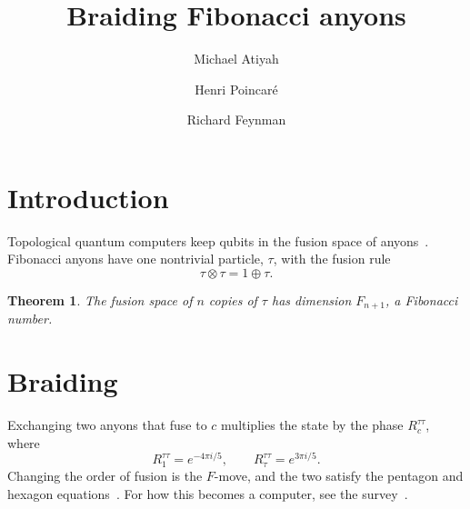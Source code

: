 \documentclass[10pt]{article}
\title{Braiding Fibonacci anyons}
\author{Michael Atiyah \and Henri Poincar\'e \and Richard Feynman}
\date{}
\newtheorem{theorem}{Theorem}
\begin{document}
\maketitle

\section{Introduction}
Topological quantum computers keep qubits in
the fusion space of anyons~\cite{kitaev03}.
Fibonacci anyons have one nontrivial particle,
$\tau$, with the fusion rule
\[ \tau \otimes \tau = 1 \oplus \tau. \]

\begin{theorem}
  The fusion space of $n$ copies of $\tau$
  has dimension $F_{n+1}$, a Fibonacci number.
\end{theorem}

\section{Braiding}
Exchanging two anyons that fuse to $c$ multiplies
the state by the phase $R^{\tau\tau}_c$, where
\[ R^{\tau\tau}_1 = e^{-4\pi i/5}, \qquad
   R^{\tau\tau}_\tau = e^{3\pi i/5}. \]
Changing the order of fusion is the $F$-move, and
the two satisfy the pentagon and hexagon
equations~\cite{kitaev06, wang10}. For how this
becomes a computer, see the survey~\cite{nayak08}.


{\small}
\end{document}

